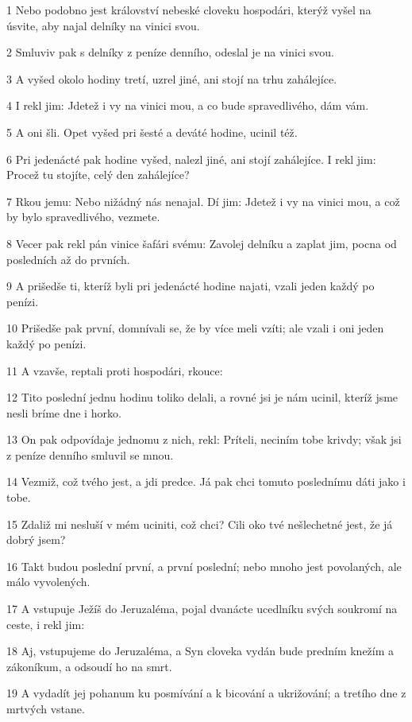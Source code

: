 \par 1 Nebo podobno jest království nebeské cloveku hospodári, kterýž vyšel na úsvite, aby najal delníky na vinici svou.
\par 2 Smluviv pak s delníky z peníze denního, odeslal je na vinici svou.
\par 3 A vyšed okolo hodiny tretí, uzrel jiné, ani stojí na trhu zahálejíce.
\par 4 I rekl jim: Jdetež i vy na vinici mou, a co bude spravedlivého, dám vám.
\par 5 A oni šli. Opet vyšed pri šesté a deváté hodine, ucinil též.
\par 6 Pri jedenácté pak hodine vyšed, nalezl jiné, ani stojí zahálejíce. I rekl jim: Procež tu stojíte, celý den zahálejíce?
\par 7 Rkou jemu: Nebo nižádný nás nenajal. Dí jim: Jdetež i vy na vinici mou, a což by bylo spravedlivého, vezmete.
\par 8 Vecer pak rekl pán vinice šafári svému: Zavolej delníku a zaplat jim, pocna od posledních až do prvních.
\par 9 A prišedše ti, kteríž byli pri jedenácté hodine najati, vzali jeden každý po penízi.
\par 10 Prišedše pak první, domnívali se, že by více meli vzíti; ale vzali i oni jeden každý po penízi.
\par 11 A vzavše, reptali proti hospodári, rkouce:
\par 12 Tito poslední jednu hodinu toliko delali, a rovné jsi je nám ucinil, kteríž jsme nesli bríme dne i horko.
\par 13 On pak odpovídaje jednomu z nich, rekl: Príteli, neciním tobe krivdy; však jsi z peníze denního smluvil se mnou.
\par 14 Vezmiž, což tvého jest, a jdi predce. Já pak chci tomuto poslednímu dáti jako i tobe.
\par 15 Zdaliž mi nesluší v mém uciniti, což chci? Cili oko tvé nešlechetné jest, že já dobrý jsem?
\par 16 Takt budou poslední první, a první poslední; nebo mnoho jest povolaných, ale málo vyvolených.
\par 17 A vstupuje Ježíš do Jeruzaléma, pojal dvanácte ucedlníku svých soukromí na ceste, i rekl jim:
\par 18 Aj, vstupujeme do Jeruzaléma, a Syn cloveka vydán bude predním knežím a zákoníkum, a odsoudí ho na smrt.
\par 19 A vydadít jej pohanum ku posmívání a k bicování a ukrižování; a tretího dne z mrtvých vstane.
